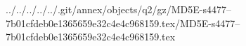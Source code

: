 ../../../../../.git/annex/objects/q2/gz/MD5E-s4477--7b01cfdeb0e1365659e32c4e4c968159.tex/MD5E-s4477--7b01cfdeb0e1365659e32c4e4c968159.tex